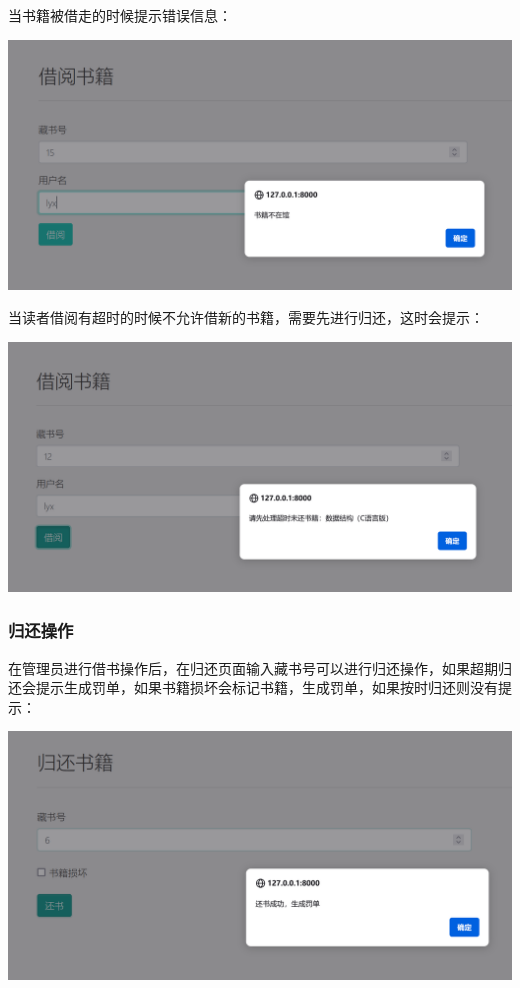 \documentclass[a4paper,14pt]{article}
\begin{document}
当书籍被借走的时候提示错误信息：
\vspace{10pt}
\begin{center}
    \includegraphics[width=0.7\linewidth]{images/jieyue2.png}\end{center}
\vspace{5pt}


当读者借阅有超时的时候不允许借新的书籍，需要先进行归还，这时会提示：
\vspace{10pt}
\begin{center}
    \includegraphics[width=0.7\linewidth]{images/jieyue3.png}\end{center}
\vspace{5pt}






\subsubsection{归还操作}
在管理员进行借书操作后，在归还页面输入藏书号可以进行归还操作，如果超期归还会提示生成罚单，如果书籍损坏会标记书籍，生成罚单，如果按时归还则没有提示：
\vspace{10pt}
\begin{center}
    \includegraphics[width=0.7\linewidth]{images/guihuan1.png}\end{center}
\vspace{5pt}
\end{document}
